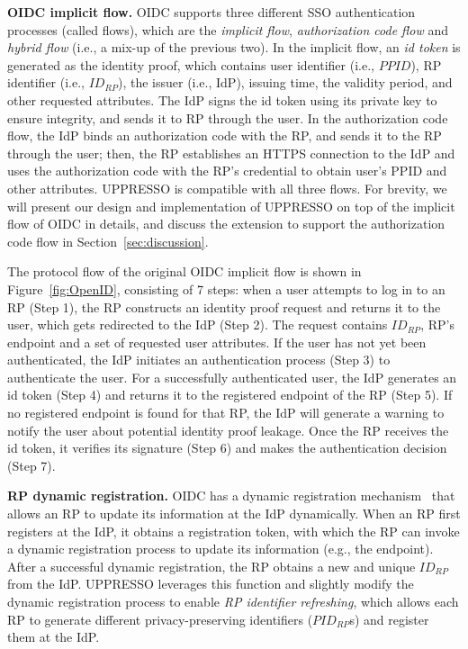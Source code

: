 \vspace{1mm}\noindent\textbf{OIDC implicit flow.} OIDC supports three different SSO authentication processes (called flows), which are the {\em implicit flow}, {\em authorization code flow} and {\em hybrid flow} (i.e., a mix-up of the previous two). In the implicit flow, an {\em id token} is generated as the identity proof, which contains user identifier (i.e., $PPID$), RP identifier (i.e., $ID_{RP}$), the issuer (i.e., IdP), issuing time, the validity period, and other requested attributes. The IdP signs the id token using its private key to ensure integrity, and sends it to RP through the user. In the authorization code flow, the IdP binds an authorization code with the RP, and sends it to the RP through the user; then, the RP establishes an HTTPS connection to the IdP %
and uses the authorization code with the RP's credential to obtain user's PPID and other attributes.
UPPRESSO is compatible with all three flows. For brevity, we will present our design and implementation of UPPRESSO on top of the implicit flow of OIDC in details, and discuss the extension to support the authorization code flow in Section~\ref{sec:discussion}.

The protocol flow of the original OIDC implicit flow is shown in Figure~\ref{fig:OpenID}, consisting of 7 steps: when a user attempts to log in to an RP (Step 1), the RP constructs an identity proof request and returns it to the user, which gets redirected to the IdP (Step 2). The request contains $ID_{RP}$, RP's endpoint and a set of requested user attributes. If the user has not yet been authenticated, the IdP initiates an authentication process (Step 3) to authenticate the user. For a successfully authenticated user, the IdP generates an id token (Step 4) and returns it to the registered endpoint of the RP (Step 5). If no registered endpoint is found for that RP, the IdP will generate a warning to notify the user about potential identity proof leakage. Once the RP receives the id token, it verifies its signature (Step 6) and makes the authentication decision (Step 7).

\vspace{1mm}\noindent\textbf{RP dynamic registration.} OIDC has a dynamic registration mechanism~\cite{DynamicRegistration} that allows an RP to update its information at the IdP dynamically. When an RP first registers at the IdP, it obtains a registration token, with which the RP can invoke a dynamic registration process to update its information (e.g., the endpoint). After a successful dynamic registration, the RP obtains a new and unique $ID_{RP}$ from the IdP. UPPRESSO leverages this function and slightly modify the dynamic registration process to enable {\em RP identifier refreshing}, which allows each RP to generate different privacy-preserving identifiers ($PID_{RP}$s) and register them at the IdP.

